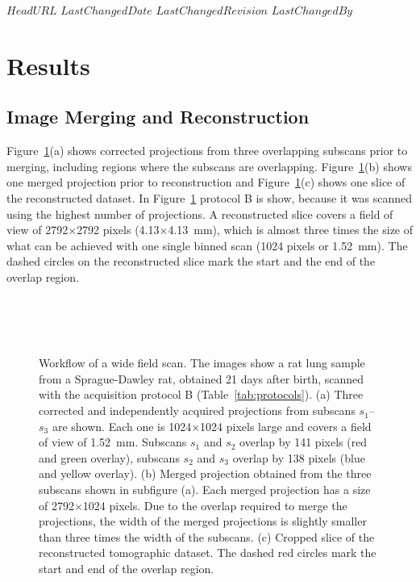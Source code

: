 \svnidlong
{$HeadURL$}
{$LastChangedDate$}
{$LastChangedRevision$}
{$LastChangedBy$}

\section{Results}\label{sec:Results}
\subsection{Image Merging and Reconstruction}\label{sec:Image Merging and Reconstruction}
Figure~\ref{fig:wide-field-scan-results}(a) shows corrected projections from three overlapping subscans prior to merging, including regions where the subscans are overlapping. Figure~\ref{fig:wide-field-scan-results}(b) shows one merged projection prior to reconstruction and Figure~\ref{fig:wide-field-scan-results}(c) shows one slice of the reconstructed dataset. In Figure~\ref{fig:wide-field-scan-results} protocol B is show, because it was scanned using the highest number of projections. A reconstructed slice covers a field of view of 2792$\times$2792 pixels (4.13$\times$\SI{4.13}{\milli\meter}), which is almost three times the size of what can be achieved with one single binned scan (1024 pixels or \SI{1.52}{\milli\meter}). %
The dashed circles on the reconstructed slice mark the start and the end of the overlap region.

\begin{figure}
	\centering
	\caption{Workflow of a wide field scan. The images show a rat lung sample from a Sprague-Dawley rat, obtained 21 days after birth, scanned with the acquisition protocol B (Table~\ref{tab:protocols}). %
			(a) Three corrected and independently acquired projections from subscans $s_1$--$s_3$ are shown. Each one is 1024\(\times\)1024 pixels large and covers a field of view of \SI{1.52}{\milli\meter}. Subscans $s_1$ and $s_2$ overlap by 141 pixels (red and green overlay), subscans $s_2$ and $s_3$ overlap by 138 pixels (blue and yellow overlay). %
			(b) Merged projection obtained from the three subscans shown in subfigure (a). Each merged projection has a size of 2792\(\times\)1024 pixels. Due to the overlap required to merge the projections, the width of the merged projections is slightly smaller than three times the width of the subscans. %
			(c) Cropped slice of the reconstructed tomographic dataset. The dashed red circles mark the start and end of the overlap region.}
	\ifiucr
		\\%
		\\%
		\\%
	\else
	\fi
	\label{fig:wide-field-scan-results}
\end{figure}

